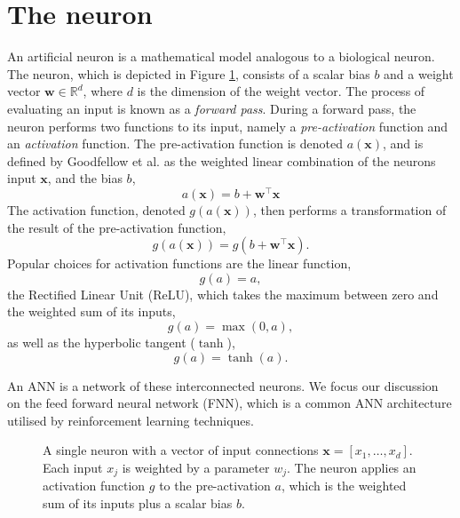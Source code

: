 \section{The neuron}
An artificial neuron is a mathematical model analogous to a biological neuron.
The neuron, which is depicted in Figure \ref{fig:neuron}, consists of a scalar bias $b$ and a weight vector $\mathbf{w} \in \mathbb{R}^d$, where $d$ is the dimension of the weight vector.
The process of evaluating an input is known as a \emph{forward pass}.
During a forward pass, the neuron performs two functions to its input, namely a \emph{pre-activation} function and an \emph{activation} function.
The pre-activation function is denoted $a(\bm{x})$, and is defined by Goodfellow et al. \cite{Goodfellow2016} as the weighted linear combination of the neurons input $\bm{x}$, and the bias $b$,
\begin{equation}
    a(\bm{x}) = b + \mathbf{w}^{\intercal}\bm{x}
    \label{eq:preactivation}
\end{equation}
The activation function, denoted $g(a(\bm{x}))$, then performs a transformation of the result of the pre-activation function, 
\begin{equation}
    g(a(\bm{x})) = g(b + \mathbf{w}^\intercal \bm{x}).
    \label{eq:activation}
\end{equation}
Popular choices for activation functions are the linear function,
\begin{equation}
    g(a) = a,
    \label{eq:linear_act}
\end{equation}
the Rectified Linear Unit (ReLU), which takes the maximum between zero and the weighted sum of its inputs,
\begin{equation}
    g(a) = \max(0,a),
    \label{eq:ReLU_act}
\end{equation}
as well as the hyperbolic tangent ($\tanh$),
\begin{equation}
    g(a) = \tanh(a).
    \label{eq:tanh_act}
\end{equation}

An ANN is a network of these interconnected neurons. 
We focus our discussion on the feed forward neural network (FNN), which is a common ANN architecture utilised by reinforcement learning techniques.


\begin{figure}[htb!]
    \centering
    
    \caption[A single neuron]{A single neuron with a vector of input connections $\bm{x} = [x_1,\ldots,x_d]$. Each input $x_j$ is weighted by a parameter $w_j$. 
    The neuron applies an activation function $g$ to the pre-activation $a$, which is the weighted sum of its inputs plus a scalar bias $b$.}
    \label{fig:neuron}
\end{figure}



